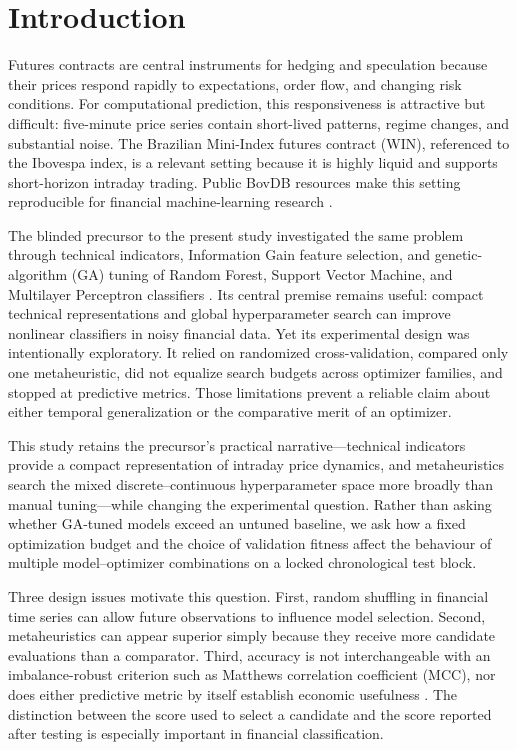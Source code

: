 \section{Introduction}\label{sec:introduction}

Futures contracts are central instruments for hedging and speculation because their prices respond rapidly to expectations, order flow, and changing risk conditions. For computational prediction, this responsiveness is attractive but difficult: five-minute price series contain short-lived patterns, regime changes, and substantial noise. The Brazilian Mini-Index futures contract (WIN), referenced to the Ibovespa index, is a relevant setting because it is highly liquid and supports short-horizon intraday trading. Public BovDB resources make this setting reproducible for financial machine-learning research \cite{cardoso2022bovdb}.

The blinded precursor to the present study investigated the same problem through technical indicators, Information Gain feature selection, and genetic-algorithm (GA) tuning of Random Forest, Support Vector Machine, and Multilayer Perceptron classifiers \cite{anonymous2026precursor}. Its central premise remains useful: compact technical representations and global hyperparameter search can improve nonlinear classifiers in noisy financial data. Yet its experimental design was intentionally exploratory. It relied on randomized cross-validation, compared only one metaheuristic, did not equalize search budgets across optimizer families, and stopped at predictive metrics. Those limitations prevent a reliable claim about either temporal generalization or the comparative merit of an optimizer.

This study retains the precursor's practical narrative---technical indicators provide a compact representation of intraday price dynamics, and metaheuristics search the mixed discrete--continuous hyperparameter space more broadly than manual tuning---while changing the experimental question. Rather than asking whether GA-tuned models exceed an untuned baseline, we ask how a fixed optimization budget and the choice of validation fitness affect the behaviour of multiple model--optimizer combinations on a locked chronological test block.

Three design issues motivate this question. First, random shuffling in financial time series can allow future observations to influence model selection. Second, metaheuristics can appear superior simply because they receive more candidate evaluations than a comparator. Third, accuracy is not interchangeable with an imbalance-robust criterion such as Matthews correlation coefficient (MCC), nor does either predictive metric by itself establish economic usefulness \cite{chicco2020mcc}. The distinction between the score used to select a candidate and the score reported after testing is especially important in financial classification.

